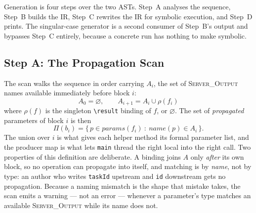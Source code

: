 \documentclass[conference]{IEEEtran}
\begin{document}
Generation is four steps over the two ASTs. Step~A analyses the sequence, Step~B
builds the IR, Step~C rewrites the IR for symbolic execution, and Step~D prints. The
singular-case generator is a second consumer of Step~B's output and bypasses Step~C
entirely, because a concrete run has nothing to make symbolic.

\subsection{Step A: The Propagation Scan}

The scan walks the sequence in order carrying $A_i$, the set of
\textsc{Server\_Output} names available immediately before block $i$:
\begin{equation}
A_0=\varnothing,\qquad
A_{i+1}=A_i\cup\rho(f_i)
\end{equation}
where $\rho(f)$ is the singleton \texttt{\textbackslash result} binding of $f$, or
$\varnothing$. The set of \emph{propagated} parameters of block $i$ is then
\begin{equation}
\Pi(b_i)=\{\,p\in\mathit{params}(f_i)\ :\ \mathit{name}(p)\in A_i\,\}.
\end{equation}
The union over $i$ is what gives each helper method its formal parameter list, and
the producer map is what lets \texttt{main} thread the right local into the right
call. Two properties of this definition are deliberate. A binding joins $A$ only
\emph{after} its own block, so no operation can propagate into itself, and matching
is by \emph{name}, not by type: an author who writes \texttt{taskId} upstream and
\texttt{id} downstream gets no propagation. Because a naming mismatch is the shape
that mistake takes, the scan emits a warning --- not an error --- whenever a
parameter's type matches an available \textsc{Server\_Output} while its name does
not.
\end{document}
